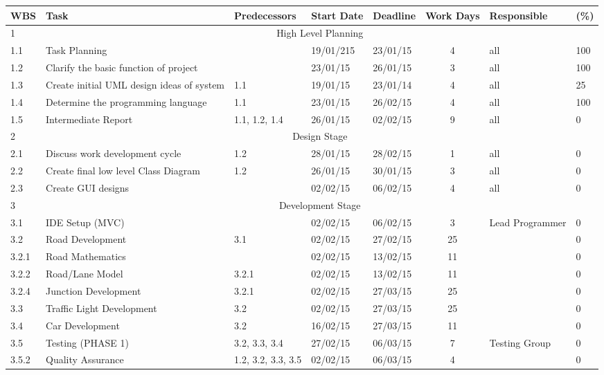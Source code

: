 \documentclass[a4paper,11pt]{article}
\begin{document}
\begin{table}[ht]
\begin{adjustwidth}{-2cm}{}
\begin{tabular}{|m{0.8cm}|m{6cm}|m{2.3cm}|m{1.3cm}|m{1.3cm}|c|m{2.6cm}|m{0.5cm}|}
			\bf{WBS} & \bf{Task} & \bf{Predecessors} & \bf{Start Date} & \bf{Deadline} & \bf{Work Days} & \bf{Responsible} & \bf{(\%)} \\ \hline 
			1 & \multicolumn{7}{c|}{High Level Planning}  \\\hline 
			1.1 & Task Planning &  & 19/01/215 & 23/01/15 & 4 & all & 100 \\ \hline 
			1.2 & Clarify the basic function of project &  & 23/01/15 & 26/01/15 & 3 & all & 100 \\ \hline 
			1.3 & Create initial UML design ideas of system & 1.1 & 19/01/15 & 23/01/14 & 4 & all & 25 \\ \hline 
			1.4 & Determine the programming language & 1.1 & 23/01/15 & 26/02/15 & 4 & all & 100 \\\hline 
			1.5 & Intermediate Report & 1.1, 1.2, 1.4 & 26/01/15 & 02/02/15 & 9 & all & 0 \\\hline 
			2 & \multicolumn{7}{c|}{Design Stage}  \\\hline 
			2.1 & Discuss work development cycle  & 1.2 & 28/01/15 & 28/02/15 & 1 & all & 0 \\\hline 
			2.2 & Create final low level Class Diagram  & 1.2 & 26/01/15 & 30/01/15 & 3 & all & 0 \\\hline 
			2.3 & Create GUI designs  &  & 02/02/15 & 06/02/15 & 4 & all & 0 \\\hline 
			3 & \multicolumn{7}{c|}{Development Stage}  \\\hline 
			3.1 & IDE Setup (MVC) &  & 02/02/15 & 06/02/15 & 3 & Lead Programmer & 0 \\\hline 
			3.2 & Road Development  & 3.1 & 02/02/15 & 27/02/15 & 25 &  & 0 \\\hline 
			3.2.1 & Road Mathematics  &  & 02/02/15 & 13/02/15 & 11 &  & 0 \\\hline 
			3.2.2 & Road/Lane Model & 3.2.1 & 02/02/15 & 13/02/15 & 11 &  & 0 \\\hline 
			3.2.4 & Junction Development  & 3.2.1 & 02/02/15 & 27/03/15 & 25 &  & 0 \\\hline 
			3.3 & Traffic Light Development & 3.2 & 02/02/15 & 27/03/15 & 25 &  & 0 \\\hline 
			3.4 & Car Development & 3.2 & 16/02/15 & 27/03/15 & 11 &  & 0 \\\hline 
			3.5 & Testing (PHASE 1) & 3.2, 3.3, 3.4 & 27/02/15 & 06/03/15 & 7 & Testing Group & 0 \\\hline 
			3.5.2 & Quality Assurance  & 1.2, 3.2, 3.3, 3.5 & 02/02/15 & 06/03/15 & 4 &  & 0 \\\hline 

\end{tabular}
\end{adjustwidth}
\end{table}
\end{document}
